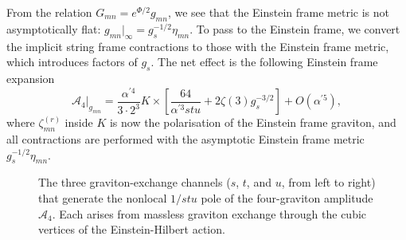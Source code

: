 From the relation $G_{mn} = e^{\Phi/2}g_{mn}$, we see that the Einstein frame metric is not asymptotically flat: $g_{mn} |_{\infty} = g_s^{-1/2}\eta_{mn}$.
To pass to the Einstein frame, we convert the implicit string frame contractions to those with the Einstein frame metric, which introduces factors of $g_s$.
The net effect is the following Einstein frame expansion
\begin{equation}
\mathcal{A}_4 \bigg|_{g_{mn}} = 
\frac{\alpha^{\prime 4}}{3\cdot 2^3 }
K
\times
\left[ \frac{64}{\alpha^{\prime 3}stu} + 2 \zeta(3)g_s^{-3/2}\right]
 + O(\alpha^{\prime 5}),
\label{eq:4-pt-virasoro-shapiro}
\end{equation}
where $\zeta_{mn}^{(r)}$ inside $K$ is now the polarisation of the Einstein frame graviton, and all contractions are performed with the asymptotic Einstein frame metric $g_s^{-1/2}\eta_{mn}$.

\begin{figure}[ht]
\centering
{}
\caption{The three graviton-exchange channels ($s$, $t$, and $u$, from left to right) that generate the nonlocal $1/stu$ pole of the four-graviton amplitude $\mathcal{A}_4$. Each arises from massless graviton exchange through the cubic vertices of the Einstein-Hilbert action.}
\label{fig:stu-channels}
\end{figure}

